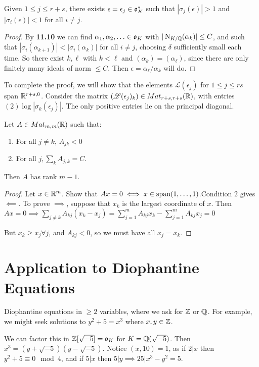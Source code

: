 \documentclass[10pt,a4paper]{article}
\begin{document}
\begin{corollary}
Given $1 \leq j \leq r+s$, there exists $\epsilon = \epsilon_j \in \mathfrak{o}_K^\ast$ such that $|\sigma_j(\epsilon)| > 1$ and $|\sigma_i(\epsilon)| < 1$ for all $i \neq j$.
\end{corollary}
\begin{proof}
By \textbf{11.10} we can find $\alpha_1, \alpha_2, \ldots \in \mathfrak{o}_K$ with $|\operatorname{N}_{K/\mathbb{Q}}(\alpha_k)| \leq C$, and such that $|\sigma_i(\alpha_{k+1})| < |\sigma_i(\alpha_k)|$ for all $i \neq j$, choosing $\delta$ sufficiently small each time. So there exist $k, \ell$ with $k < \ell$ and $(\alpha_k) = (\alpha_\ell)$, since there are only finitely many ideals of norm $\leq C$. Then $\epsilon = \alpha_\ell/\alpha_k$ will do.
\end{proof}
To complete the proof, we will show that the elements $\mathscr{L}(\epsilon_j)$ for $1 \leq j \leq rs$ span $\mathbb{R}^{r+s, 0}$. Consider the matrix $(\mathscr{L}(\epsilon_j)_k) \in Mat_{r+s, r+s}(\mathbb{R})$, with entries $(2)\log |\sigma_k(\epsilon_j)|$. The only positive entries lie on the principal diagonal.
\begin{lemma}
Let $A \in Mat_{m,m}(\mathbb{R})$ such that:
\begin{enumerate}
\item For all $j \neq k$, $A_{jk} <0$
\item For all $j, \sum_k A_{j,k} = C$.
\end{enumerate}
Then $A$ has rank $m-1$.
\end{lemma}
\begin{proof}
Let $x \in \mathbb{R}^m$. Show that $Ax = 0 \iff x \in \operatorname{span}(1, \ldots, 1)$.Condition $2$ gives $\impliedby$. To prove $\implies$, suppose that $x_k$ is the largest coordinate of $x$. Then $Ax = 0 \implies \sum_{j \neq  k} A_{kj}(x_k-x_j) = \sum_{j=1}^m A_{kj}x_k - \sum_{j=1}^m A_{kj} x_j = 0$

But $x_k \geq x_j \forall j$, and $A_{kj} <0$, so we must have all $x_j = x_k$.
\end{proof}
\section{Application to Diophantine Equations}
Diophantine equations in $\geq 2$ variables, where we ask for $\mathbb{Z}$ or $\mathbb{Q}$. For example, we might seek solutions to $y^2 + 5= x^3$ where $x,y \in \mathbb{Z}$. 

We can factor this in $\mathbb{Z}[\sqrt{-5}] = \mathfrak{o}_{K}$ for $K = \mathbb{Q}(\sqrt{-5})$. Then $x^3 = (y+\sqrt{-5})(y-\sqrt{-5})$. Notice $(x,10) =1$, as if $2|x$ then $y^2+5 \equiv 0 \mod 4$, and if $5|x$ then $5|y \implies 25|x^3-y^2 = 5$.
\end{document}
